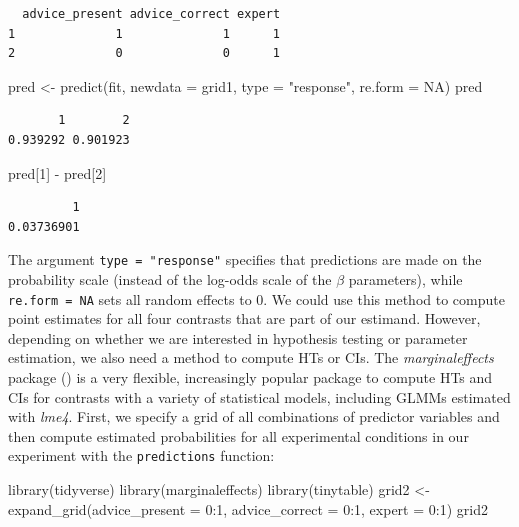 \documentclass[
  man,
  floatsintext,
  longtable,
  a4paper,
  nolmodern,
  notxfonts,
  notimes,
  colorlinks=true,linkcolor=blue,citecolor=blue,urlcolor=blue]{apa7}
\newenvironment{Shaded}{\begin{snugshade}}{\end{snugshade}}
\newcommand{\AttributeTok}[1]{\textcolor[rgb]{0.40,0.45,0.13}{#1}}
\newcommand{\ConstantTok}[1]{\textcolor[rgb]{0.56,0.35,0.01}{#1}}
\newcommand{\DecValTok}[1]{\textcolor[rgb]{0.68,0.00,0.00}{#1}}
\newcommand{\FunctionTok}[1]{\textcolor[rgb]{0.28,0.35,0.67}{#1}}
\newcommand{\NormalTok}[1]{\textcolor[rgb]{0.00,0.23,0.31}{#1}}
\newcommand{\OtherTok}[1]{\textcolor[rgb]{0.00,0.23,0.31}{#1}}
\newcommand{\SpecialCharTok}[1]{\textcolor[rgb]{0.37,0.37,0.37}{#1}}
\newcommand{\StringTok}[1]{\textcolor[rgb]{0.13,0.47,0.30}{#1}}
\begin{document}
\begin{verbatim}
  advice_present advice_correct expert
1              1              1      1
2              0              0      1
\end{verbatim}

\begin{Shaded}
\begin{Highlighting}[]
\NormalTok{pred }\OtherTok{\textless{}{-}} \FunctionTok{predict}\NormalTok{(fit, }\AttributeTok{newdata =}\NormalTok{ grid1, }\AttributeTok{type =} \StringTok{"response"}\NormalTok{, }\AttributeTok{re.form =} \ConstantTok{NA}\NormalTok{)}
\NormalTok{pred}
\end{Highlighting}
\end{Shaded}

\begin{verbatim}
       1        2 
0.939292 0.901923 
\end{verbatim}

\begin{Shaded}
\begin{Highlighting}[]
\NormalTok{pred[}\DecValTok{1}\NormalTok{] }\SpecialCharTok{{-}}\NormalTok{ pred[}\DecValTok{2}\NormalTok{]}
\end{Highlighting}
\end{Shaded}

\begin{verbatim}
         1 
0.03736901 
\end{verbatim}

The argument \texttt{type\ =\ "response"} specifies that predictions are
made on the probability scale (instead of the log-odds scale of the
\(\beta\) parameters), while \texttt{re.form\ =\ NA} sets all random
effects to 0. We could use this method to compute point estimates for
all four contrasts that are part of our estimand. However, depending on
whether we are interested in hypothesis testing or parameter estimation,
we also need a method to compute HTs or CIs. The \emph{marginaleffects}
package () is a very flexible, increasingly popular package to
compute HTs and CIs for contrasts with a variety of statistical models,
including GLMMs estimated with \emph{lme4}. First, we specify a grid of
all combinations of predictor variables and then compute estimated
probabilities for all experimental conditions in our experiment with the
\texttt{predictions} function:

\begin{Shaded}
\begin{Highlighting}[]
\FunctionTok{library}\NormalTok{(tidyverse)}
\FunctionTok{library}\NormalTok{(marginaleffects)}
\FunctionTok{library}\NormalTok{(tinytable)}
\NormalTok{grid2 }\OtherTok{\textless{}{-}} \FunctionTok{expand\_grid}\NormalTok{(}\AttributeTok{advice\_present =} \DecValTok{0}\SpecialCharTok{:}\DecValTok{1}\NormalTok{, }
  \AttributeTok{advice\_correct =} \DecValTok{0}\SpecialCharTok{:}\DecValTok{1}\NormalTok{, }\AttributeTok{expert =} \DecValTok{0}\SpecialCharTok{:}\DecValTok{1}\NormalTok{)}
\NormalTok{grid2}
\end{Highlighting}
\end{Shaded}
\end{document}
